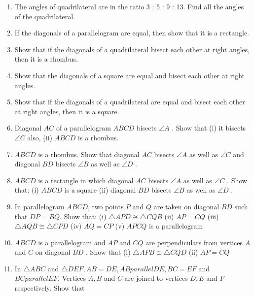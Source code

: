 \renewcommand{\theequation}{\theenumi}
\begin{enumerate}[label=\arabic*.,ref=\thesubsection.\theenumi]
\item The angles of quadrilateral are in the ratio 3 : 5 : 9 : 13. Find all the angles of the quadrilateral.
\item If the diagonals of a parallelogram are equal, then show that it is a rectangle. 
\item Show that if the diagonals of a quadrilateral bisect each other at right angles, then it is a rhombus.
\item Show that the diagonals of a square are equal and bisect each other at right angles. 
\item Show that if the diagonals of a quadrilateral are equal and bisect each other at right angles, then it is a square.
\item Diagonal $AC$ of a parallelogram $ABCD$ bisects $\angle A$ . Show that
(i) it bisects  $\angle C$  also, (ii) $ABCD$ is a rhombus.
\item $ABCD$ is a rhombus. Show that diagonal $AC$ bisects $\angle A$ as well as  $\angle C$  and diagonal $BD$ bisects  $\angle B$  as well as  $\angle D$ .
\item $ABCD$ is a rectangle in which diagonal $AC$ bisects $\angle A$ as well as  $\angle C$ . Show that: (i) $ABCD$ is a square (ii) diagonal $BD$ bisects  $\angle B$  as well as  $\angle D$ .
\item In parallelogram $ABCD$, two points $P$ and $Q$ are taken on diagonal $BD$ such that $DP = BQ$. Show that: (i)  $\triangle  APD  \cong   \triangle  CQB$ (ii) $AP = CQ$ (iii)  $\triangle  AQB  \cong   \triangle  CPD$ (iv) $AQ = CP$ (v) $APCQ$ is a parallelogram
\item $ABCD$ is a parallelogram and $AP$ and $CQ$ are perpendiculars from vertices $A$ and $C$ on diagonal $BD$ . Show that (i)  $\triangle  APB  \cong   \triangle  CQD $ (ii) $AP = CQ$
\item In  $\triangle  ABC$ and  $\triangle  DEF, AB = DE, AB  parallel  DE, BC = EF$ and $BC  parallel  EF$. Vertices $A, B$ and $C$ are joined to vertices $D, E$ and $F$ respectively. Show that

\end{enumerate}
